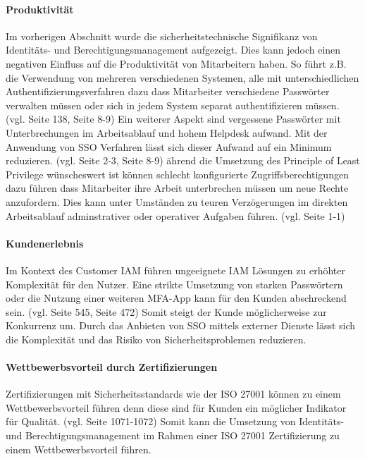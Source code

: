 \documentclass[11pt]{article}
\begin{document}
\paragraph{Produktivität}
Im vorherigen Abschnitt wurde die sicherheitstechnische Signifikanz von Identitäts- und Berechtigungsmanagement aufgezeigt. Dies kann jedoch einen negativen Einfluss auf die Produktivität von Mitarbeitern haben. So führt z.B. die Verwendung von mehreren verschiedenen Systemen, alle mit unterschiedlichen Authentifizierungsverfahren dazu dass Mitarbeiter verschiedene Passwörter verwalten müssen oder sich in jedem System separat authentifizieren müssen. (vgl. \cite{radha2012survey} Seite 138, \cite{haag2012selecting} Seite 8-9) Ein weiterer Aspekt sind vergessene Passwörter mit Unterbrechungen im Arbeitsablauf und hohem Helpdesk aufwand. Mit der Anwendung von SSO Verfahren lässt sich dieser Aufwand auf ein Minimum reduzieren. (vgl. \cite{thakur2015user} Seite 2-3, \cite{haag2012selecting} Seite 8-9) ährend die Umsetzung des Principle of Least Privilege wünscheswert ist können schlecht konfigurierte Zugriffsberechtigungen dazu führen dass Mitarbeiter ihre Arbeit unterbrechen müssen um neue Rechte anzufordern. Dies kann unter Umständen zu teuren Verzögerungen im direkten Arbeitsablauf adminstrativer oder operativer Aufgaben führen. (vgl. \cite{weishaupl2015towards} Seite 1-1)
\paragraph{Kundenerlebnis}
Im Kontext des Customer IAM führen ungeeignete IAM Lösungen zu erhöhter Komplexität für den Nutzer. Eine strikte Umsetzung von starken Passwörtern oder die Nutzung einer weiteren MFA-App kann für den Kunden abschreckend sein. (vgl. \cite{azhar2014economics} Seite 545, \cite{liveretos2022customer} Seite 472) Somit steigt der Kunde möglicherweise zur Konkurrenz um. Durch das Anbieten von SSO mittels externer Dienste lässt sich die Komplexität und das Risiko von Sicherheitsproblemen reduzieren.
\paragraph{Wettbewerbsvorteil durch Zertifizierungen}
Zertifizierungen mit Sicherheitsstandards wie der ISO 27001 können zu einem Wettbewerbsvorteil führen denn diese sind für Kunden ein möglicher Indikator für Qualität. (vgl. \cite{dobrin2015quality} Seite 1071-1072) Somit kann die Umsetzung von Identitäts- und Berechtigungsmanagement im Rahmen einer ISO 27001 Zertifizierung zu einem Wettbewerbsvorteil führen.
\end{document}
